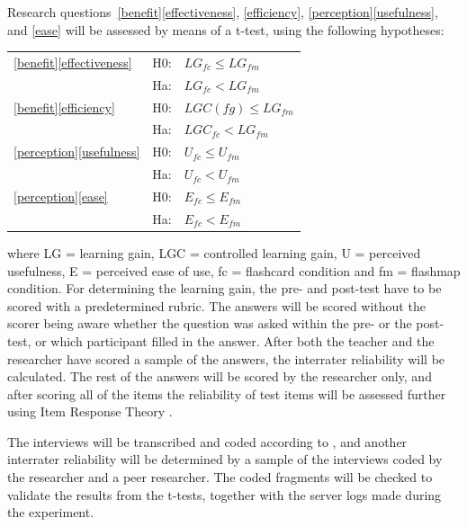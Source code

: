 
Research questions~\ref{benefit}\ref{effectiveness}, \ref{efficiency}, \ref{perception}\ref{usefulness}, and \ref{ease} will be assessed by means of a t-test, using the following hypotheses: 

\begin{tabular}{l l l}
\ref{benefit}\ref{effectiveness} & H0: & $LG_{fc} \leq LG_{fm}$ \\
                                 & Ha: & $LG_{fc} < LG_{fm}$ \\
\ref{benefit}\ref{efficiency}    & H0: & $LGC(fg) \leq LG_{fm}$ \\
                                 & Ha: & $ LGC_{fc} < LG_{fm}$ \\
\ref{perception}\ref{usefulness} & H0: & $U_{fc} \leq U_{fm}$ \\
                                 & Ha: & $U_{fc} < U_{fm}$ \\
\ref{perception}\ref{ease}       & H0: & $E_{fc} \leq E_{fm}$ \\
                                 & Ha: & $E_{fc} < E_{fm}$ \\
\end{tabular}

\noindent where LG = learning gain, LGC = controlled learning gain, U = perceived usefulness, E = perceived ease of use, fc = flashcard condition and fm = flashmap condition. For determining the learning gain, the pre- and post-test have to be scored with a predetermined rubric. The answers will be scored without the scorer being aware whether the question was asked within the pre- or the post-test, or which participant filled in the answer. After both the teacher and the researcher have scored a sample of the answers, the interrater reliability will be calculated. The rest of the answers will be scored by the researcher only, and after scoring all of the items the reliability of test items will be assessed further using Item Response Theory \cite{irt}.

The interviews will be transcribed and coded according to , and another interrater reliability will be determined by a sample of the interviews coded by the researcher and a peer researcher. The coded fragments will be checked to validate the results from the t-tests, together with the server logs made during the experiment.

